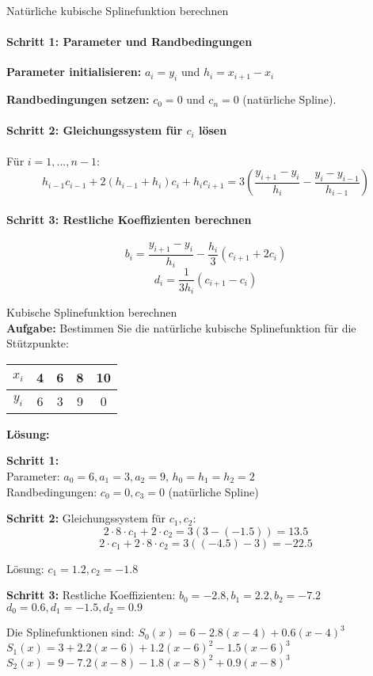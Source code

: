 \begin{KR}{Natürliche kubische Splinefunktion berechnen}
\paragraph{Schritt 1: Parameter und Randbedingungen}
\textbf{Parameter initialisieren:}
$a_i = y_i$ und $h_i = x_{i+1} - x_i$

\textbf{Randbedingungen setzen:} $c_0 = 0$ und $c_n = 0$ (natürliche Spline).

\paragraph{Schritt 2: Gleichungssystem für $c_i$ lösen}
Für $i = 1, ..., n-1$:
$$h_{i-1} c_{i-1} + 2(h_{i-1} + h_i) c_i + h_i c_{i+1} = 3\left(\frac{y_{i+1} - y_i}{h_i} - \frac{y_i - y_{i-1}}{h_{i-1}}\right)$$

\paragraph{Schritt 3: Restliche Koeffizienten berechnen}
$$b_i = \frac{y_{i+1} - y_i}{h_i} - \frac{h_i}{3}(c_{i+1} + 2c_i)$$
$$d_i = \frac{1}{3h_i}(c_{i+1} - c_i)$$
\end{KR}

\begin{example2}{Kubische Splinefunktion berechnen}\\
\textbf{Aufgabe:} Bestimmen Sie die natürliche kubische Splinefunktion für die Stützpunkte:
\begin{center}
\begin{tabular}{|c|c|c|c|c|}
\hline
$x_i$ & 4 & 6 & 8 & 10 \\
\hline
$y_i$ & 6 & 3 & 9 & 0 \\
\hline
\end{tabular}
\end{center}
\tcblower
\textbf{Lösung:}

\textbf{Schritt 1:} \\
Parameter: $a_0 = 6, a_1 = 3, a_2 = 9$, $h_0 = h_1 = h_2 = 2$\\
Randbedingungen: $c_0 = 0, c_3 = 0$ (natürliche Spline)

\textbf{Schritt 2:} Gleichungssystem für $c_1, c_2$:
$$2 \cdot 8 \cdot c_1 + 2 \cdot c_2 = 3(3 - (-1.5)) = 13.5$$
$$2 \cdot c_1 + 2 \cdot 8 \cdot c_2 = 3((-4.5) - 3) = -22.5$$

Lösung: $c_1 = 1.2, c_2 = -1.8$

\textbf{Schritt 3:} Restliche Koeffizienten:
$b_0 = -2.8, b_1 = 2.2, b_2 = -7.2$
$d_0 = 0.6, d_1 = -1.5, d_2 = 0.9$

Die Splinefunktionen sind:
$S_0(x) = 6 - 2.8(x-4) + 0.6(x-4)^3$
$S_1(x) = 3 + 2.2(x-6) + 1.2(x-6)^2 - 1.5(x-6)^3$
$S_2(x) = 9 - 7.2(x-8) - 1.8(x-8)^2 + 0.9(x-8)^3$
\end{example2}




